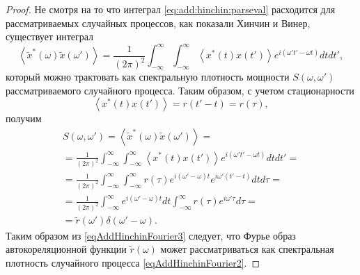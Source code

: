 \begin{theorem}
\begin{proof}
Не смотря на то что интеграл \eqref{eq:add:hinchin:parseval}
расходится для
рассматриваемых случайных процессов, как показали Хинчин и Винер,
существует интеграл
\begin{equation}
\left<\tilde{x}^{*}\left(\omega\right)\tilde{x}\left(\omega'\right)\right>
= 
\frac{1}{\left(2 \pi\right)^2}
\int_{-\infty}^{\infty}\int_{-\infty}^{\infty}\left<x^{*}\left(t\right)x\left(t'\right)\right>e^{i
  \left(\omega' t' - \omega t\right)}dtdt',
\label{eqAddHinchinFourier2}
\end{equation}
который можно трактовать как спектральную плотность мощности $S\left(\omega,\omega'\right)$
рассматриваемого случайного процесса. Таким образом, с учетом стационарности
\[
\left<x^{*}\left(t\right)x\left(t'\right)\right> = r\left(t' - t\right) = r\left(\tau\right),
\]
получим
\begin{eqnarray}
S\left(\omega, \omega'\right) =
\left<\tilde{x}^{*}\left(\omega\right)\tilde{x}\left(\omega'\right)\right>
= 
\nonumber \\
=
\frac{1}{\left(2 \pi\right)^2}
\int_{-\infty}^{\infty}\int_{-\infty}^{\infty}\left<x^{*}\left(t\right)x\left(t'\right)\right>e^{i
  \left(\omega' t' - \omega t\right)}dtdt' =
\nonumber \\
=
\frac{1}{\left(2 \pi\right)^2}
\int_{-\infty}^{\infty}\int_{-\infty}^{\infty}
r\left(\tau\right)
e^{i\left(\omega' - \omega\right) t}
e^{i\omega'\left(t' - t\right) }
dtd\tau =
\nonumber \\
=
\frac{1}{\left(2 \pi\right)^2}
\int_{-\infty}^{\infty}
e^{i \left(\omega' - \omega\right) t}dt 
\int_{-\infty}^{\infty}r\left(\tau\right)
e^{i \omega' \tau}d\tau =
\nonumber \\
= \tilde{r}\left(\omega'\right)\delta\left(\omega' - \omega\right). 
\label{eqAddHinchinFourier3}
\end{eqnarray}
Таким образом из \eqref{eqAddHinchinFourier3} следует, что Фурье образ
автокореляционной функции $\tilde{r}\left(\omega\right)$ может
рассматриваться как спектральная плотность случайного процесса
\eqref{eqAddHinchinFourier2}. 
\end{proof}
\end{theorem}
